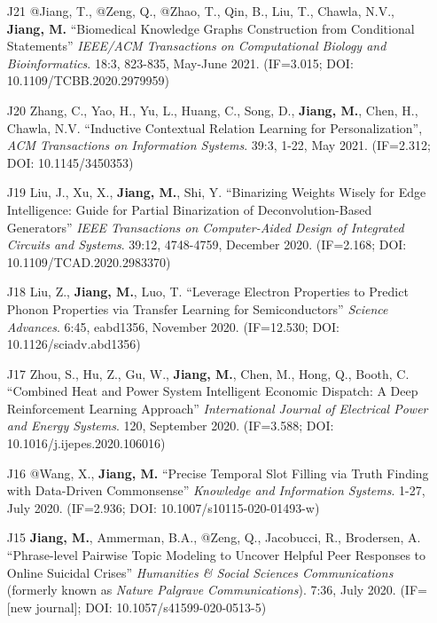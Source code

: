 \documentclass[10pt]{article}
\newenvironment{myindentpar}[1]%
{\begin{list}{}%
         {\setlength{\leftmargin}{#1}}%
         \item[]%
}
{\end{list}}
\newcounter{list}
\begin{document}
\begin{myindentpar}{0.00cm}
\begin{enumerate}[leftmargin=.5cm]
\item[J21] @Jiang, T., @Zeng, Q., @Zhao, T., Qin, B., Liu, T., Chawla, N.V., \textbf{Jiang, M.} ``Biomedical Knowledge Graphs Construction from Conditional Statements'' \textit{IEEE/ACM Transactions on Computational Biology and Bioinformatics}. 18:3, 823-835, May-June 2021. (IF=3.015; DOI: 10.1109/TCBB.2020.2979959)

\item[J20] Zhang, C., Yao, H., Yu, L., Huang, C., Song, D., \textbf{Jiang, M.}, Chen, H., Chawla, N.V. ``Inductive Contextual Relation Learning for Personalization'', \textit{ACM Transactions on Information Systems}. 39:3, 1-22, May 2021. (IF=2.312; DOI: 10.1145/3450353)

\item[J19] Liu, J., Xu, X., \textbf{Jiang, M.}, Shi, Y. ``Binarizing Weights Wisely for Edge Intelligence: Guide for Partial Binarization of Deconvolution-Based Generators'' \textit{IEEE Transactions on Computer-Aided Design of Integrated Circuits and Systems}. 39:12, 4748-4759, December 2020. (IF=2.168; DOI: 10.1109/TCAD.2020.2983370)

\item[J18] Liu, Z., \textbf{Jiang, M.}, Luo, T. ``Leverage Electron Properties to Predict Phonon Properties via Transfer Learning for Semiconductors'' \textit{Science Advances}. 6:45, eabd1356, November 2020. (IF=12.530; DOI: 10.1126/sciadv.abd1356)
	
\item[J17] Zhou, S., Hu, Z., Gu, W., \textbf{Jiang, M.}, Chen, M., Hong, Q., Booth, C. ``Combined Heat and Power System Intelligent Economic Dispatch: A Deep Reinforcement Learning Approach'' \textit{International Journal of Electrical Power and Energy Systems}. 120, September 2020. (IF=3.588; DOI: 10.1016/j.ijepes.2020.106016)

\item[J16] @Wang, X., \textbf{Jiang, M.} ``Precise Temporal Slot Filling via Truth Finding with Data-Driven Commonsense'' \textit{Knowledge and Information Systems}. 1-27, July 2020. (IF=2.936; DOI: 10.1007/s10115-020-01493-w)

\item[J15] \textbf{Jiang, M.}, Ammerman, B.A., @Zeng, Q., Jacobucci, R., Brodersen, A. ``Phrase-level Pairwise Topic Modeling to Uncover Helpful Peer Responses to Online Suicidal Crises'' \textit{Humanities \& Social Sciences Communications} (formerly known as \textit{Nature Palgrave Communications}). 7:36, July 2020. (IF=[new journal]; DOI: 10.1057/s41599-020-0513-5)


\end{enumerate}
\end{myindentpar}
\end{document}
